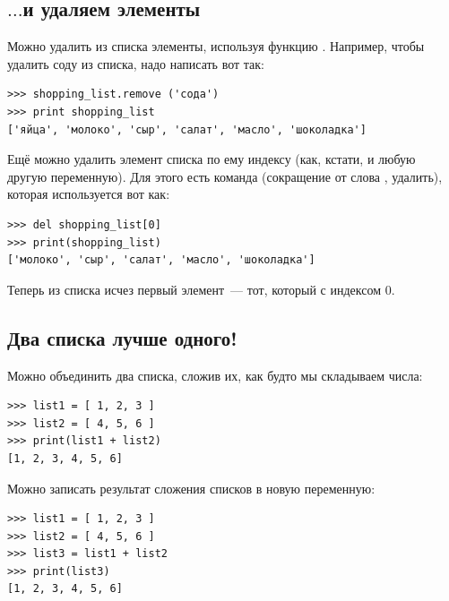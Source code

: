 
\subsection*{\color{BrickRed}$\ldots$и удаляем элементы}

Можно удалить из списка элементы, используя функцию . Например, чтобы удалить соду из списка, надо написать вот так:

\begin{listing}
\begin{verbatim}
>>> shopping_list.remove ('сода')
>>> print shopping_list
['яйца', 'молоко', 'сыр', 'салат', 'масло', 'шоколадка']
\end{verbatim}
\end{listing}

Ещё можно удалить элемент списка по ему индексу (как, кстати, и любую другую переменную). Для этого есть команда  (сокращение от слова , удалить), которая используется вот как:

\begin{listing}
\begin{verbatim}
>>> del shopping_list[0]
>>> print(shopping_list)
['молоко', 'сыр', 'салат', 'масло', 'шоколадка']
\end{verbatim}
\end{listing}

Теперь из списка исчез первый элемент — тот, который с индексом 0.

\subsection*{\color{BrickRed}Два списка лучше одного!}

Можно объединить два списка, сложив их, как будто мы складываем числа:

\begin{listing}
\begin{verbatim}
>>> list1 = [ 1, 2, 3 ]
>>> list2 = [ 4, 5, 6 ]
>>> print(list1 + list2)
[1, 2, 3, 4, 5, 6]
\end{verbatim}
\end{listing}

Можно записать результат сложения списков в новую переменную:

\begin{listing}
\begin{verbatim}
>>> list1 = [ 1, 2, 3 ]
>>> list2 = [ 4, 5, 6 ]
>>> list3 = list1 + list2
>>> print(list3)
[1, 2, 3, 4, 5, 6]
\end{verbatim}
\end{listing}

